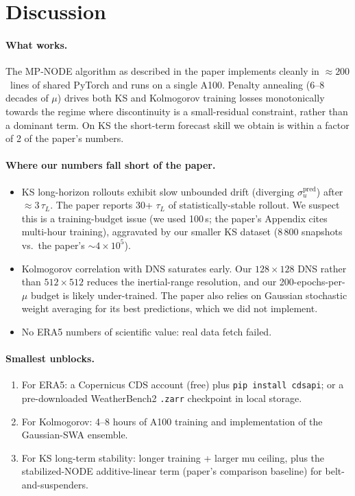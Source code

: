 \documentclass[11pt]{article}
\begin{document}
\section{Discussion}

\paragraph{What works.} The MP-NODE algorithm as described in the
paper implements cleanly in $\approx 200$~lines of shared PyTorch
and runs on a single A100. Penalty annealing (6--8 decades of $\mu$)
drives both KS and Kolmogorov training losses monotonically towards
the regime where discontinuity is a small-residual constraint, rather
than a dominant term. On KS the short-term forecast skill we obtain
is within a factor of 2 of the paper's numbers.

\paragraph{Where our numbers fall short of the paper.}
\begin{itemize}
\item KS long-horizon rollouts exhibit slow unbounded drift
(diverging $\sigma_u^{\text{pred}}$) after $\approx 3\,\tau_L$.
The paper reports 30+ $\tau_L$ of statistically-stable rollout.
We suspect this is a training-budget issue (we used 100\,s;
the paper's Appendix cites multi-hour training), aggravated by our
smaller KS dataset ($8\,800$ snapshots vs.\ the paper's $\sim 4\times
10^5$).
\item Kolmogorov correlation with DNS saturates early.
Our $128\times128$ DNS rather than $512\times512$ reduces the
inertial-range resolution, and our 200-epochs-per-$\mu$ budget is
likely under-trained. The paper also relies on Gaussian
stochastic weight averaging for its best predictions, which we
did not implement.
\item No ERA5 numbers of scientific value: real data fetch failed.
\end{itemize}

\paragraph{Smallest unblocks.}
\begin{enumerate}
  \item For ERA5: a Copernicus CDS account (free) plus
        \texttt{pip install cdsapi}; or a pre-downloaded
        WeatherBench2 \texttt{.zarr} checkpoint in local storage.
  \item For Kolmogorov: 4--8 hours of A100 training and implementation
        of the Gaussian-SWA ensemble.
  \item For KS long-term stability: longer training + larger mu
        ceiling, plus the stabilized-NODE additive-linear term
        (paper's comparison baseline) for belt-and-suspenders.
\end{enumerate}
\end{document}
